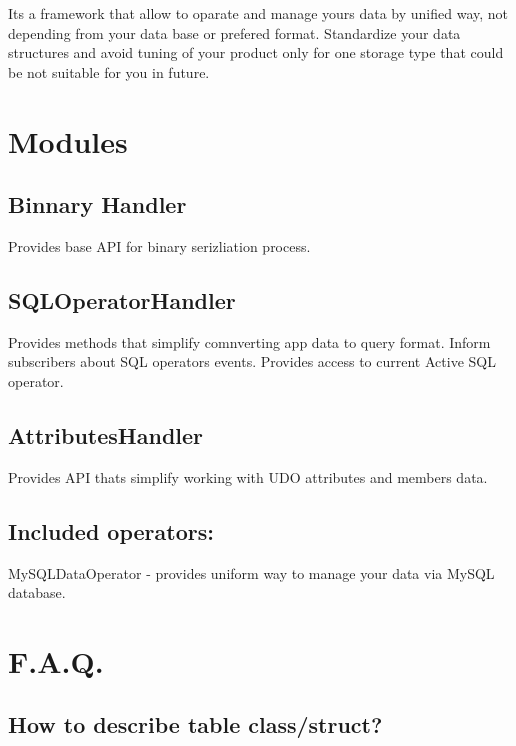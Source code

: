It\textquotesingle{}s a framework that allow to oparate and manage yours data by unified way, not depending from your data base or prefered format. Standardize your data structures and avoid tuning of your product only for one storage type that could be not suitable for you in future.

\section*{Modules}

\subsection*{Binnary Handler}

Provides base A\+PI for binary serizliation process.

\subsection*{S\+Q\+L\+Operator\+Handler}

Provides methods that simplify comnverting app data to query format. Inform subscribers about S\+QL operators events. Provides access to current Active S\+QL operator.

\subsection*{Attributes\+Handler}

Provides A\+PI thats simplify working with U\+DO attributes and members data.

\subsection*{Included operators\+:}


\begin{DoxyItemize}
\item My\+S\+Q\+L\+Data\+Operator -\/ provides uniform way to manage your data via My\+S\+QL database.
\end{DoxyItemize}

\section*{F.\+A.\+Q.}

\subsection*{How to describe table class/struct?}

